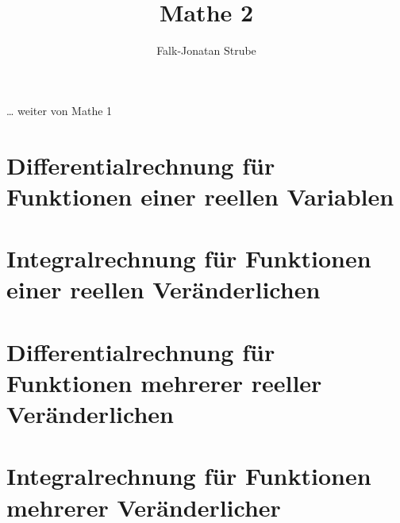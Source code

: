\documentclass{scrreprt}
\title{Mathe 2}
\author{Falk-Jonatan Strube}
\begin{document}
\maketitle
\tableofcontents\clearpage

\begin{Huge}
… weiter von Mathe 1
\end{Huge}
\setcounter{chapter}{2}
\setcounter{section}{1}
\setcounter{subsection}{2}


\chapter{Differentialrechnung für Funktionen einer reellen Variablen}


\chapter{Integralrechnung für Funktionen einer reellen Veränderlichen}


\chapter{Differentialrechnung für Funktionen mehrerer reeller Veränderlichen}


\chapter{Integralrechnung für Funktionen mehrerer Veränderlicher}

\end{document}
